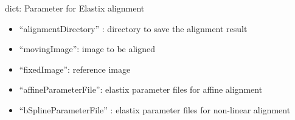 \documentclass[letterpaper,10pt,english]{sphinxmanual}
\begin{document}
\begin{fulllineitems}
\label{api/ClearMap.Parameter:ClearMap.Parameter.AlignmentParameter}
dict: Parameter for Elastix alignment
\begin{itemize}
\item {} 
``alignmentDirectory'' : directory to save the alignment result

\item {} 
``movingImage'': image to be aligned

\item {} 
``fixedImage'':  reference image

\item {} 
``affineParameterFile'': elastix parameter files for affine alignment

\item {} 
``bSplineParameterFile'' : elastix parameter files for non-linear alignment

\end{itemize}




{\hyperref[api/ClearMap.Alignment:module-ClearMap.Alignment.Elastix]{\emph{}}}



\end{fulllineitems}

\end{document}
